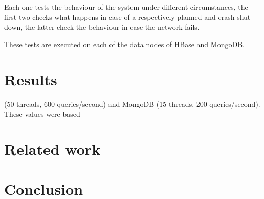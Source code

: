 \documentclass[final,5p,times]{elsarticle}
\begin{document}
Each one tests the behaviour of the system under different circumstances, the first two checks what happens in case of a respectively planned and crash shut down, the latter check the behaviour in case the network fails. 

These tests are executed on each of the data nodes of HBase and MongoDB.  
 

\section{Results}\label{sec:result}
(50 threads, 600 queries/second) and MongoDB (15 threads, 200 queries/second). These values were based 
\section{Related work}

\section{Conclusion}











\end{document}
